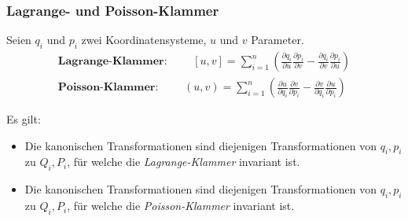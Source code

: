 \begin{frame}
    \frametitle{Lagrange- und Poisson-Klammer}

    Seien $q_i$ und $p_i$ zwei Koordinatensysteme, $u$ und $v$ Parameter. \\

    \begin{align*}
    \textbf{Lagrange-Klammer: } \qquad    [u,v] = \sum_{i=1}^{n} \left(   \frac{\partial q_i}{\partial u} \frac{\partial p_i}{\partial v} - \frac{\partial q_i}{\partial v} \frac{\partial p_i}{\partial u}  \right)  \\
    \textbf{Poisson-Klammer: } \qquad    (u,v) = \sum_{i=1}^{n} \left(   \frac{\partial u}{\partial q_i} \frac{\partial v}{\partial p_i} - \frac{\partial v}{\partial q_i} \frac{\partial u}{\partial p_i}  \right)  
    \end{align*}

\end{frame}

\begin{frame}
    Es gilt:
    \vspace{5mm}
    \begin{itemize}
        \item Die kanonischen Transformationen sind diejenigen Transformationen von $q_i,p_i$ zu $Q_i,P_i$, für welche die \emph{Lagrange-Klammer} invariant ist.
        \vspace{5mm}
        \item Die kanonischen Transformationen sind diejenigen Transformationen von $q_i,p_i$ zu $Q_i,P_i$, für welche die \emph{Poisson-Klammer} invariant ist.
    \end{itemize}
    
\end{frame}

